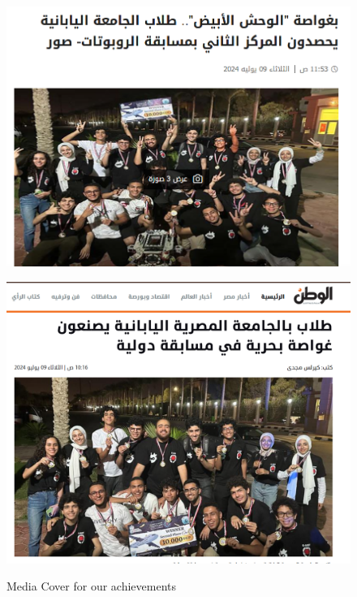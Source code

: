 \documentclass[11pt, twocolumn]{article}
\begin{document}
\begin{figure}[h]
    \centering
    \begin{minipage}{0.46\textwidth}
        \centering
        \includegraphics[width=\textwidth]{Images/Masrawy.png}
        
        \label{fig:masrawy}
    \end{minipage}
    \hfill
    \begin{minipage}{0.44\textwidth}
        \centering
        \includegraphics[width=\textwidth]{Images/Elwatan news.png}
      
        \label{fig:elwatan}
    \end{minipage}
    \caption{Media Cover for our achievements }
    \label{fig:news}
\end{figure}
\end{document}
